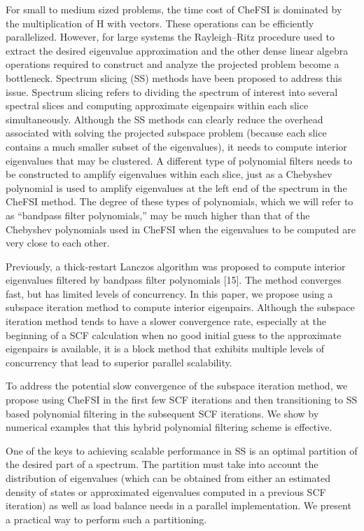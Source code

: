\documentclass[
  10
]{article}
\begin{document}
For small to medium sized problems, the time cost of CheFSI is dominated
by the multiplication of H with vectors. These operations can be
efficiently parallelized. However, for large systems the Rayleigh--Ritz
procedure used to extract the desired eigenvalue approximation and the
other dense linear algebra operations required to construct and analyze
the projected problem become a bottleneck. Spectrum slicing (SS) methods
have been proposed to address this issue. Spectrum slicing refers to
dividing the spectrum of interest into several spectral slices and
computing approximate eigenpairs within each slice simultaneously.
Although the SS methods can clearly reduce the overhead associated with
solving the projected subspace problem (because each slice contains a
much smaller subset of the eigenvalues), it needs to compute interior
eigenvalues that may be clustered. A different type of polynomial
filters needs to be constructed to amplify eigenvalues within each
slice, just as a Chebyshev polynomial is used to amplify eigenvalues at
the left end of the spectrum in the CheFSI method. The degree of these
types of polynomials, which we will refer to as ``bandpass filter
polynomials,'' may be much higher than that of the Chebyshev polynomials
used in CheFSI when the eigenvalues to be computed are very close to
each other.

Previously, a thick-restart Lanczos algorithm was proposed to compute
interior eigenvalues filtered by bandpass filter polynomials {[}15{]}.
The method converges fast, but has limited levels of concurrency. In
this paper, we propose using a subspace iteration method to compute
interior eigenpairs. Although the subspace iteration method tends to
have a slower convergence rate, especially at the beginning of a SCF
calculation when no good initial guess to the approximate eigenpairs is
available, it is a block method that exhibits multiple levels of
concurrency that lead to superior parallel scalability.

To address the potential slow convergence of the subspace iteration
method, we propose using CheFSI in the first few SCF iterations and then
transitioning to SS based polynomial filtering in the subsequent SCF
iterations. We show by numerical examples that this hybrid polynomial
filtering scheme is effective.

One of the keys to achieving scalable performance in SS is an optimal
partition of the desired part of a spectrum. The partition must take
into account the distribution of eigenvalues (which can be obtained from
either an estimated density of states or approximated eigenvalues
computed in a previous SCF iteration) as well as load balance needs in a
parallel implementation. We present a practical way to perform such a
partitioning.
\end{document}

